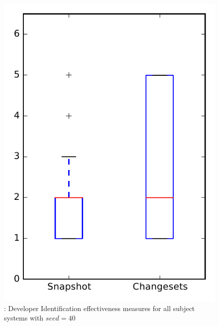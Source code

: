 
\begin{figure}
\centering
\includegraphics[height=0.4\textheight]{figures/dit_seed/rq1_overview_40}
\caption{\rtwo: Developer Identification effectiveness measures for all subject systems with $seed=40$}
\label{fig:dit_seed:rq1:overview}
\end{figure}
